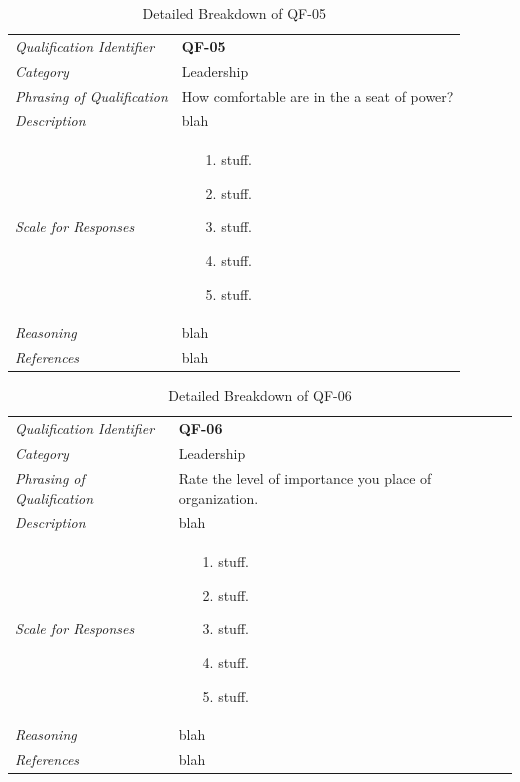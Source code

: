 \documentclass[12pt,letterpaper]{article}
\begin{document}
\begin{table}[H]
	\caption{Detailed Breakdown of QF-05}
	\begin{tabu} to 
		\toprule
		Qualification Identifier & {\bf QF-05}\\
		Category & Leadership \\
		Phrasing of Qualification & How comfortable are in the a seat of power? \\
		Description & blah\\
		Scale for Responses &
		\begin{minipage}[t]{\linewidth}
			\begin{enumerate}
				\item[1.] stuff.
				\item[2.] stuff.
				\item[3.] stuff.
				\item[4.] stuff.
				\item[5.] stuff.
			\end{enumerate}
		\end{minipage}\\
		Reasoning & blah\\
		References & blah\\
		\toprule
	\end{tabu}
\end{table}

\begin{table}[H]
	\caption{Detailed Breakdown of QF-06}
	\begin{tabu} to 
		\toprule
		Qualification Identifier & {\bf QF-06}\\
		Category & Leadership \\
		Phrasing of Qualification & Rate the level of importance you place of organization.\\
		Description & blah\\
		Scale for Responses &
		\begin{minipage}[t]{\linewidth}
			\begin{enumerate}
				\item[1.] stuff.
				\item[2.] stuff.
				\item[3.] stuff.
				\item[4.] stuff.
				\item[5.] stuff.
			\end{enumerate}
		\end{minipage}\\
		Reasoning & blah\\
		References & blah\\
		\toprule
	\end{tabu}
\end{table}
\end{document}
